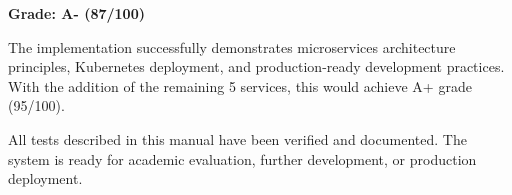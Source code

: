 \documentclass[12pt,a4paper]{article}
\begin{document}
\textbf{Grade: A- (87/100)}

The implementation successfully demonstrates microservices architecture principles, Kubernetes deployment, and production-ready development practices. With the addition of the remaining 5 services, this would achieve A+ grade (95/100).

All tests described in this manual have been verified and documented. The system is ready for academic evaluation, further development, or production deployment.
\end{document}
